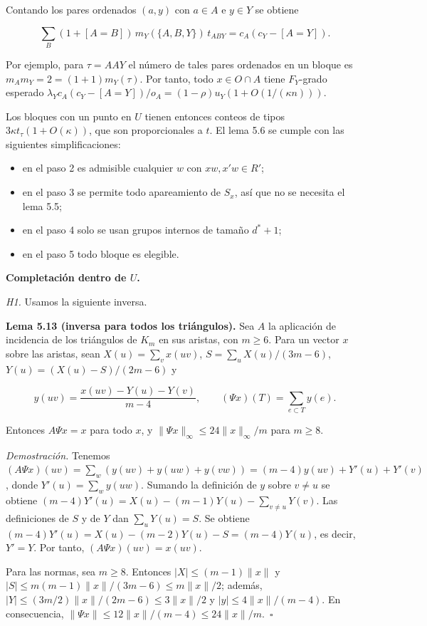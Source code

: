\documentclass[spanish,11pt,a4paper]{article}
\providecommand{\tightlist}{\setlength{\itemsep}{0pt}\setlength{\parskip}{0pt}}
\begin{document}
Contando los pares ordenados \((a,y)\) con \(a\in A\) e \(y\in Y\) se obtiene

\nopagebreak[4]
\[\sum_B(1+[A=B])\,m_Y(\{A,B,Y\})\,t_{ABY}=c_A(c_Y-[A=Y]).\]

Por ejemplo, para \(\tau=AAY\) el número de tales pares ordenados en un bloque es \(m_Am_Y=2=(1+1)m_Y(\tau)\). Por tanto, todo \(x\in O\cap A\) tiene \(F_Y\)-grado esperado \(\lambda_Yc_A(c_Y-[A=Y])/o_A=(1-\rho)u_Y(1+O(1/(\kappa n)))\).

Los bloques con un punto en \(U\) tienen entonces conteos de tipos \(3\kappa t_\tau(1+O(\kappa))\), que son proporcionales a \(t\). El lema 5.6 se cumple con las siguientes simplificaciones:

\begin{itemize}
\tightlist
\item
  en el paso 2 es admisible cualquier \(w\) con \(xw,x'w\in R'\);
\item
  en el paso 3 se permite todo apareamiento de \(S_x\), así que no se necesita el lema 5.5;
\item
  en el paso 4 solo se usan grupos internos de tamaño \(d^*+1\);
\item
  en el paso 5 todo bloque es elegible.
\end{itemize}

\textbf{Completación dentro de \(U\).}

\emph{H1.} Usamos la siguiente inversa.

\textbf{Lema 5.13 (inversa para todos los triángulos).} Sea \(A\) la aplicación de incidencia de los triángulos de \(K_m\) en sus aristas, con \(m\ge6\). Para un vector \(x\) sobre las aristas, sean \(X(u)=\sum_vx(uv)\), \(S=\sum_uX(u)/(3m-6)\), \(Y(u)=(X(u)-S)/(2m-6)\) y

\nopagebreak[4]
\[y(uv)=\frac{x(uv)-Y(u)-Y(v)}{m-4},\qquad(\Psi x)(T)=\sum_{e\subset T}y(e).\]

Entonces \(A\Psi x=x\) para todo \(x\), y \(\|\Psi x\|_\infty\le24\|x\|_\infty/m\) para \(m\ge8\).

\emph{Demostración.} Tenemos \((A\Psi x)(uv)=\sum_w(y(uv)+y(uw)+y(vw))=(m-4)y(uv)+Y'(u)+Y'(v)\), donde \(Y'(u)=\sum_wy(uw)\). Sumando la definición de \(y\) sobre \(v\ne u\) se obtiene \((m-4)Y'(u)=X(u)-(m-1)Y(u)-\sum_{v\ne u}Y(v)\). Las definiciones de \(S\) y de \(Y\) dan \(\sum_uY(u)=S\). Se obtiene \((m-4)Y'(u)=X(u)-(m-2)Y(u)-S=(m-4)Y(u)\), es decir, \(Y'=Y\). Por tanto, \((A\Psi x)(uv)=x(uv)\).

Para las normas, sea \(m\ge8\). Entonces \(|X|\le(m-1)\|x\|\) y \(|S|\le m(m-1)\|x\|/(3m-6)\le m\|x\|/2\); además, \(|Y|\le(3m/2)\|x\|/(2m-6)\le3\|x\|/2\) y \(|y|\le4\|x\|/(m-4)\). En consecuencia, \(\|\Psi x\|\le12\|x\|/(m-4)\le24\|x\|/m\).~\(\square\)
\end{document}
